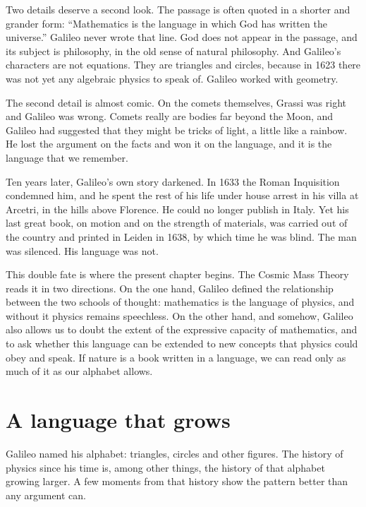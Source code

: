 Two details deserve a second look. The passage is often quoted in a shorter and grander form: \enquote{Mathematics is the language in which God has written the universe.} Galileo never wrote that line. God does not appear in the passage, and its subject is philosophy, in the old sense of natural philosophy. And Galileo's characters are not equations. They are triangles and circles, because in 1623 there was not yet any algebraic physics to speak of. Galileo worked with geometry.

The second detail is almost comic. On the comets themselves, Grassi was right and Galileo was wrong. Comets really are bodies far beyond the Moon, and Galileo had suggested that they might be tricks of light, a little like a rainbow. He lost the argument on the facts and won it on the language, and it is the language that we remember.

Ten years later, Galileo's own story darkened. In 1633 the Roman Inquisition condemned him, and he spent the rest of his life under house arrest in his villa at Arcetri, in the hills above Florence. He could no longer publish in Italy. Yet his last great book, on motion and on the strength of materials, was carried out of the country and printed in Leiden in 1638, by which time he was blind. The man was silenced. His language was not.

This double fate is where the present chapter begins. The Cosmic Mass Theory reads it in two directions. On the one hand, Galileo defined the relationship between the two schools of thought: mathematics is the language of physics, and without it physics remains speechless. On the other hand, and somehow, Galileo also allows us to doubt the extent of the expressive capacity of mathematics, and to ask whether this language can be extended to new concepts that physics could obey and speak. If nature is a book written in a language, we can read only as much of it as our alphabet allows.

\section{A language that grows}\label{sec:language-grows}

Galileo named his alphabet: triangles, circles and other figures. The history of physics since his time is, among other things, the history of that alphabet growing larger. A few moments from that history show the pattern better than any argument can.

